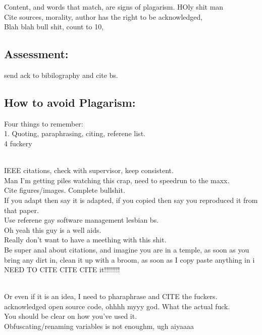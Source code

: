 \documentclass [12pt]{article}
\begin{document}
Content, and words that match, are signs of plagarism. HOly shit man\\ 

Cite sources, morality, author has the right to be acknowledged,\\ Blah blah bull shit, count to 10,\\ 

\subsection{Assessment:}

send ack to bibilography and cite bs.\\

\subsection{How to avoid Plagarism:}

Four things to remember:\\

1. Quoting, paraphrasing, citing, referene list.\\ 

4 fuckery\\\

IEEE citations, check with supervisor, keep consistent.\\ 
Man I'm getting piles watching this crap, need to speedrun to the maxx.\\ 

Cite figures/images. Complete bullshit.\\ 
If you adapt then say it is adapted, if you copied then say you reproduced it from that paper.\\ 

Use referene gay software management lesbian bs.\\ 

Oh yeah this guy  is a well aids.\\ Really don't want to have a meething with this shit.\\ 

Be super anal about citations, and imagine you are in a temple, as soon as you bring any dirt in, clean it up with a broom, as soon as I copy paste anything in i NEED TO CITE CITE CITE it!!!!!!!!\\\

Or even if it is an idea, I need to pharaphrase and CITE the fuckers.\\ 

acknowledged open source code, ohhhh myyy god. What the actual fuck.\\ 
You should be clear on how you've used it.\\ 
Obfuscating/renaming variables is not enoughm, ugh aiyaaaa\\ 
\end{document}
